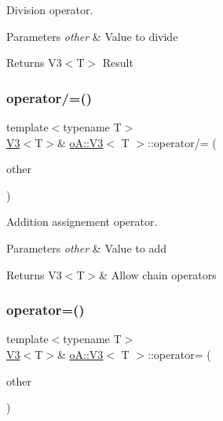 Division operator. 


\begin{DoxyParams}{Parameters}
{\em other} & Value to divide \\
\hline
\end{DoxyParams}
\begin{DoxyReturn}{Returns}
V3$<$\+T$>$ Result 
\end{DoxyReturn}
\mbox{\label{structo_a_1_1_v3_a6bd81647929ff9d4ba4aa992074317e2}} 
\subsubsection{\texorpdfstring{operator/=()}{operator/=()}}
{\footnotesize\ttfamily template$<$typename T$>$ \\
\mbox{\hyperlink{structo_a_1_1_v3}{V3}}$<$T$>$\& \mbox{\hyperlink{structo_a_1_1_v3}{o\+A\+::\+V3}}$<$ T $>$\+::operator/= (\begin{DoxyParamCaption}\item[{const \mbox{\hyperlink{structo_a_1_1_v3}{o\+A\+::\+V3}}$<$ T $>$ \&}]{other }\end{DoxyParamCaption})\hspace{0.3cm}{\ttfamily [inline]}}



Addition assignement operator. 


\begin{DoxyParams}{Parameters}
{\em other} & Value to add \\
\hline
\end{DoxyParams}
\begin{DoxyReturn}{Returns}
V3$<$\+T$>$\& Allow chain operators 
\end{DoxyReturn}
\mbox{\label{structo_a_1_1_v3_a87a850c59abfbf1ad9fbaa15865e24fe}} 
\subsubsection{\texorpdfstring{operator=()}{operator=()}\hspace{0.1cm}{\footnotesize\ttfamily [1/2]}}
{\footnotesize\ttfamily template$<$typename T$>$ \\
\mbox{\hyperlink{structo_a_1_1_v3}{V3}}$<$T$>$\& \mbox{\hyperlink{structo_a_1_1_v3}{o\+A\+::\+V3}}$<$ T $>$\+::operator= (\begin{DoxyParamCaption}\item[{\mbox{\hyperlink{structo_a_1_1_v3}{o\+A\+::\+V3}}$<$ T $>$ \&\&}]{other }\end{DoxyParamCaption})\hspace{0.3cm}{\ttfamily [inline]}}




